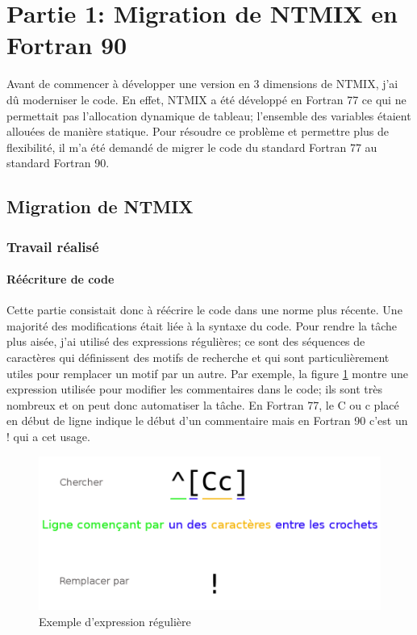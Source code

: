 \section{Partie 1: Migration de NTMIX en Fortran 90}

Avant de commencer à développer une version en 3 dimensions de NTMIX, j'ai dû moderniser le code. En effet, NTMIX a été développé en Fortran 77 ce qui ne permettait pas l'allocation dynamique de tableau; l'ensemble des variables étaient allouées de manière statique. Pour résoudre ce problème et permettre plus de flexibilité, il m'a été demandé de migrer le code du standard Fortran 77 au standard Fortran 90.

\subsection{Migration de NTMIX}
\subsubsection{Travail réalisé}

\paragraph{Réécriture de code}Cette partie consistait donc à réécrire le code dans une norme plus récente. Une majorité des modifications était liée à la syntaxe du code. Pour rendre la tâche plus aisée, j'ai utilisé des expressions régulières; ce sont des séquences de caractères qui définissent des motifs de recherche et qui sont particulièrement utiles pour remplacer un motif par un autre. Par exemple, la figure \ref{fig:regex} montre une expression utilisée pour modifier les commentaires dans le code; ils sont très nombreux et on peut donc automatiser la tâche. En Fortran 77, le C ou c placé en début de ligne indique le début d'un commentaire mais en Fortran 90 c'est un ! qui a cet usage.

\begin{figure}[ht]
  \centering
  \includegraphics[scale=0.3]{figures/regex.png}
  \caption{\label{fig:regex}Exemple d'expression régulière}
\end{figure}

